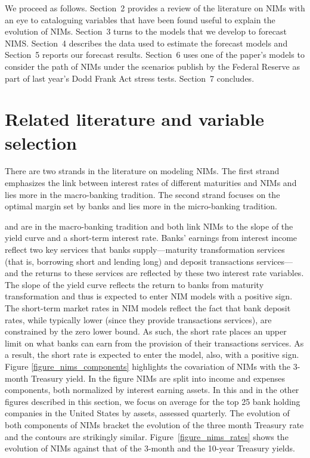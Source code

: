 \documentclass[11pt]{article}
\begin{document}
We proceed as follows.  Section~2 provides a review of the literature on NIMs with an eye to cataloguing variables that have been found useful to explain the evolution of NIMs.  Section~3 turns to the models that we develop to forecast NIMS.  Section~4 describes the data used to estimate the forecast models and Section~5 reports our forecast results.  Section~6 uses one of the paper's models to consider the path of NIMs under the scenarios publish by the Federal Reserve as part of last year's Dodd Frank Act stress tests.  Section~7 concludes.

\section{Related literature and variable selection}

\vspace{-0.1in}
There are two strands in the literature on modeling NIMs.  The first strand emphasizes the link between interest rates of different maturities and NIMs and lies more in the macro-banking tradition.  The second strand focuses on the optimal margin set by banks and lies more in the micro-banking tradition.
 
 and  are in the macro-banking tradition and both link NIMs to the slope of the yield curve and a short-term interest rate.  Banks' earnings from interest income reflect two key services that banks supply---maturity transformation services (that is, borrowing short and lending long) and deposit transactions services---and the returns to these services are reflected by these two interest rate variables.  The slope of the yield curve reflects the return to banks from maturity transformation and thus is expected to enter NIM models with a positive sign. The short-term market rates in NIM models reflect the fact that bank deposit rates, while typically lower (since they provide transactions services), are constrained by the zero lower bound.  As such, the short rate places an upper limit on what banks can earn from the provision of their transactions services. As a result, the short rate is expected to enter the model, also, with a positive sign. Figure \ref{figure_nims_components} highlights the covariation of NIMs with the 3-month Treasury yield.  In the figure NIMs are split into income and expenses components, both normalized by interest earning assets. In this and in the other figures described in this section, we focus on average for the top 25 bank holding companies in the United States by assets, assessed quarterly.  The evolution of both components of NIMs bracket the evolution of the three month Treasury rate and the contours are strikingly similar. Figure~\ref{figure_nims_rates} shows the evolution of NIMs against that of the 3-month and the 10-year Treasury yields.
\end{document}

